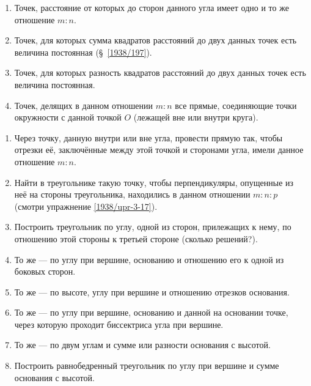 {\begin{enumerate}
\item \label{1938/upr-3-17}
Точек, расстояние от которых до сторон данного угла имеет одно и то же отношение $m:n$.

\item
Точек, для которых сумма квадратов расстояний до двух данных точек есть величина постоянная (§~\ref{1938/197}).

\item
Точек, для которых разность квадратов расстояний до двух данных точек есть величина постоянная.

\item
Точек, делящих в данном отношении $m:n$ все прямые, соединяющие точки окружности с данной точкой $O$ (лежащей вне или внутри круга).

\end{enumerate}

\begin{center}
\end{center}

\begin{enumerate}

\item
Через точку, данную внутри или вне угла, провести прямую так, чтобы отрезки её, заключённые между этой точкой и сторонами угла, имели данное отношение $m:n$.

\item
Найти в треугольнике такую точку, чтобы перпендикуляры, опущенные из неё на стороны треугольника, находились в данном отношении $m:n:p$ (смотри упражнение \ref{1938/upr-3-17}).

\item
Построить треугольник по углу, одной из сторон, прилежащих к нему, по отношению этой стороны к третьей стороне (сколько решений?).

\item
То же — по углу при вершине, основанию и отношению его к одной из боковых сторон.

\item
То же — по высоте, углу при вершине и отношению отрезков основания.

\item
То же — по углу при вершине, основанию и данной на основании точке, через которую проходит биссектриса угла при вершине.

\item
То же — по двум углам и сумме или разности основания с высотой.

\item
Построить равнобедренный треугольник по углу при вершине и сумме основания с высотой.


\end{enumerate}}
